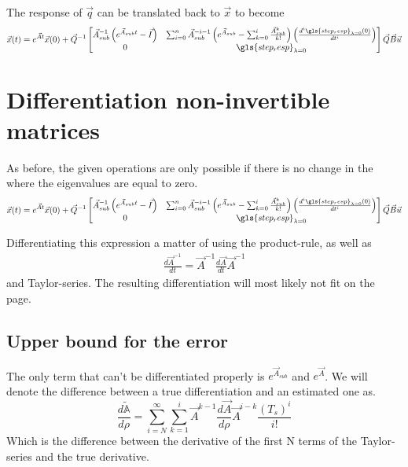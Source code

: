 The response of $\Vec{q}$ can be translated back to $\Vec{x}$ to become
\begin{dmath}
    \Vec{x}(t) = 
    e^{\Vec{A}t}\Vec{x}(0)
    + 
    \Vec{Q}^{-1}
    \begin{bmatrix}
        \Vec{A}_{sub}^{-1}\left(e^{\Vec{A}_{sub} t} -\Vec{I}\right) &
        \sum_{i=0}^n \Vec{A}_{sub}^{-i-1}\left( e^{\Vec{A}_{sub} } - \sum_{k=0}^{i} \frac{\Vec{A}^k_{sub}}{k!}\right) \left( \frac{d^i \gls{step_resp}_{\lambda=0}(0)}{dt^i}  \right)  \\
        0 & \gls{step_resp}_{\lambda=0} 
    \end{bmatrix}
    \Vec{Q}\Vec{B}\Vec{u}
\end{dmath}

\section{Differentiation non-invertible matrices}
\label{sec:upper_bound_for_errors_in_noninvertible_systems}
As before, the given operations are only possible if there is no change in the where the eigenvalues are equal to zero. 
\begin{dmath}
    \Vec{x}(t) = 
    e^{\Vec{A}t}\Vec{x}(0)
    + 
    \Vec{Q}^{-1}
    \begin{bmatrix}
        \Vec{A}_{sub}^{-1}\left(e^{\Vec{A}_{sub} t} -\Vec{I}\right) &
        \sum_{i=0}^n \Vec{A}_{sub}^{-i-1}\left( e^{\Vec{A}_{sub} } - \sum_{k=0}^{i} \frac{\Vec{A}^k_{sub}}{k!}\right) \left( \frac{d^i \gls{step_resp}_{\lambda=0}(0)}{dt^i}  \right)  \\
        0 & \gls{step_resp}_{\lambda=0} 
    \end{bmatrix}
    \Vec{Q}\Vec{B}\Vec{u}
\end{dmath}

Differentiating this expression a matter of using the product-rule, as well as 
\begin{align}
    \frac{d \Vec{A}^{-1}}{dt} = \Vec{A}^{-1} \frac{d \Vec{A}}{dt}\Vec{A}^{-1}
\end{align}
and Taylor-series. The resulting differentiation will most likely not fit on the page. 
\subsection{Upper bound for the error}
The only term that can't be differentiated properly is $e^{\Vec{A}_{sub}}$ and  $e^{\Vec{A}}$. We will denote the difference between a true differentiation and an estimated one as. 
\begin{equation}
    \frac{ d \tilde{\mathbb{A} } }{d\rho } = \sum_{i=N}^\infty \sum_{k=1}^i \Vec{A}^{k-1}\frac{d \Vec{A}}{d \rho}\Vec{A}^{i-k}\frac{\left(T_s \right)^i }{i!}
\end{equation} 
Which is the difference between the derivative of the first N terms of the Taylor-series and the true derivative. 

